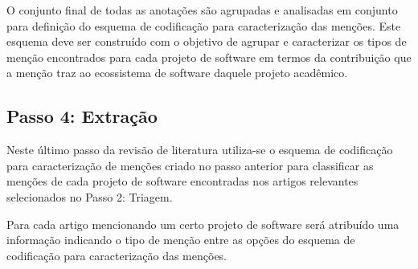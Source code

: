 O conjunto final de todas as anotações são agrupadas e analisadas em conjunto
para definição do esquema de codificação para caracterização das menções. Este
esquema deve ser construído com o objetivo de agrupar e caracterizar os tipos
de menção encontrados para cada projeto de software em termos da contribuição
que a menção traz ao ecossistema de software daquele projeto acadêmico.






\subsection{Passo 4: Extração}

Neste último passo da revisão de literatura utiliza-se o esquema de codificação
para caracterização de menções criado no passo anterior para classificar as
menções de cada projeto de software encontradas nos artigos relevantes
selecionados no Passo 2: Triagem.

Para cada artigo mencionando um certo projeto de software será atribuído uma
informação indicando o tipo de menção entre as opções do esquema de codificação
para caracterização das menções.



